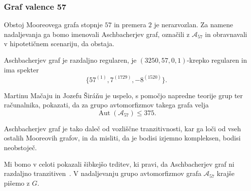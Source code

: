 \documentclass[fin1, tisk]{fmfdelo}
\newcommand{\asch}{\mathscr{A}_{57}}
\newcommand{\aut}{\operatorname{Aut}}
\begin{document}
\subsubsection{Graf valence 57}
Obstoj Mooreovega grafa stopnje $57$ in premera $2$ je nerazvozlan. 
Za namene nadaljevanja ga bomo imenovali Aschbacherjev graf, označili z $\asch$
in obravnavali v hipotetičnem scenariju, da obstaja.

Aschbacherjev graf je razdaljno regularen, je $(3250, 57, 0, 1)$-krepko regularen in ima spekter $$\{57^{(1)}, 7^{(1729)}, -8^{(1520)}\}.$$

Martinu Mačaju in Jozefu Širá\v{n}u \cite{mavcaj2010search} je uspelo, s pomočjo napredne teorije grup ter računalnika, 
pokazati, da za grupo avtomorfizmov
takega grafa velja $$\aut(\asch) \leq 375.$$

Aschbacherjev graf je tako daleč od vozliščne tranzitivnosti, kar ga loči od vseh ostalih Mooreovih grafov,
in da misliti, da je bodisi izjemno kompleksen, bodisi neobstoječ.

Mi bomo v celoti pokazali šibkejšo trditev, ki pravi, da Aschbacherjev graf ni razdaljno tranzitiven~\cite{aschbacher1971nonexistence}. 
V nadaljevanju
grupo avtomorfizmov grafa $\asch$ krajše pišemo z $G$.



\end{document}
